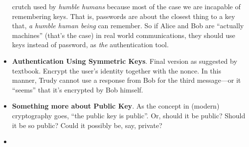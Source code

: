 \documentclass[twocolumn]{article}
\begin{document}
\begin{itemize}
  crutch used by \emph{humble humans} because most of the case we are
  incapable of remembering keys. That is, passwords are about the
  closest thing to a key that, \emph{a humble human being} can
  remember. So if Alice and Bob are ``actually machines'' (that's the
  case) in real world communications, they should use keys instead of
  password, as \emph{the} authentication tool.
\item \textbf{Authentication Using Symmetric Keys}. Final version as
  suggested by textbook. Encrypt the user's identity together with the
  nonce. In this manner, Trudy cannot use a response from Bob for the
  third message---or it ``seems'' that it's encrypted by Bob himself.
\item \textbf{Something more about Public Key}. As the concept in
  (modern) cryptography goes, ``the public key is public''. Or, should
  it be public? Should it be so public? Could it possibly be, say,
  private? 
\item 
\end{itemize}
\end{document}
